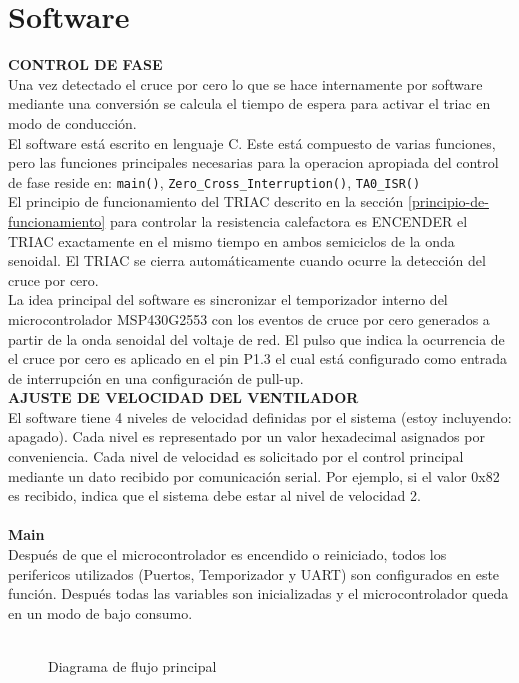 \documentclass{article}
\begin{document}
    \section{Software}
    \textbf{CONTROL DE FASE}\\
    Una vez detectado el cruce por cero lo que se hace internamente por software mediante una conversión se calcula el tiempo de espera para activar el triac en modo de conducción.\\
    El software est\'a escrito en lenguaje C. Este est\'a compuesto de varias funciones, pero las funciones principales necesarias para la operacion apropiada del control de fase reside en: \verb|main()|, \verb|Zero_Cross_Interruption()|, \verb|TA0_ISR()|\\
    El principio de funcionamiento del TRIAC descrito en la secci\'on \ref{principio-de-funcionamiento} para controlar la resistencia calefactora es ENCENDER el TRIAC exactamente en el mismo tiempo en ambos semiciclos de la onda senoidal. El TRIAC se cierra autom\'aticamente cuando ocurre la detecci\'on del cruce por cero.\\
    La idea principal del software es sincronizar el temporizador interno del microcontrolador MSP430G2553 con los eventos de cruce por cero generados a partir de la onda senoidal del voltaje de red. El pulso que indica la ocurrencia de el cruce por cero es aplicado en el pin P1.3 el cual est\'a configurado como entrada de interrupci\'on en una configuraci\'on de pull-up.\\
    
    \textbf{AJUSTE DE VELOCIDAD DEL VENTILADOR}\\
    El software tiene 4 niveles de velocidad definidas por el sistema (estoy incluyendo: apagado). Cada nivel es representado por un valor hexadecimal asignados por conveniencia. Cada nivel de velocidad es solicitado por el control principal mediante un dato recibido por comunicación serial. Por ejemplo, si el valor 0x82 es recibido, indica que el sistema debe estar al nivel de velocidad 2. \\ \\


        \textbf{Main} \\
        Despu\'es de que el microcontrolador es encendido o reiniciado, todos los perifericos utilizados (Puertos, Temporizador y UART) son configurados en este funci\'on. Despu\'es todas las variables son inicializadas y el microcontrolador queda en un modo de bajo consumo.
        \\ \\
        \begin{figure}[ht]
            \centering
            \tcbox[ sharp corners, left=30mm,right=30mm, boxsep=5mm, boxrule=0.3mm, colback=white ]
                {       }
            \caption{Diagrama de flujo principal}
            \label{fig:my_lab}
        \end{figure}
\end{document}
